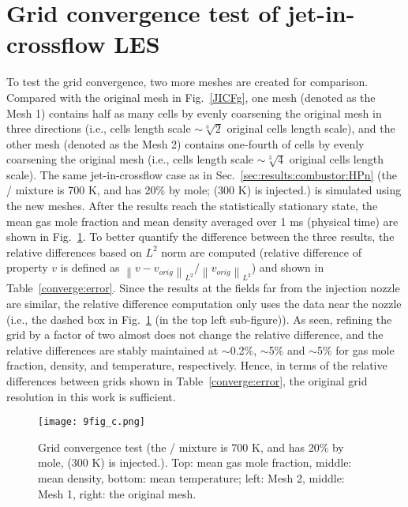 \section{Grid convergence test of jet-in-crossflow LES} \label{app:coverge}

    To test the grid convergence, two more meshes are created for comparison. Compared with the original mesh in Fig.~\ref{JICFg}, one mesh (denoted as the Mesh 1) contains half as many cells by evenly coarsening the original mesh in three directions (i.e., cells length scale $\sim \sqrt[3]{2}$ original cells length scale), and the other mesh (denoted as the Mesh 2) contains one-fourth of cells by evenly coarsening the original mesh (i.e., cells length scale $\sim \sqrt[3]{4}$ original cells length scale). The same jet-in-crossflow case as in Sec.~\ref{sec:results:combustor:HPn} (the / mixture is 700 K, and has 20\%  by mole;  (300 K) is injected.) is simulated using the new meshes. After the results reach the statistically stationary state, the mean gas mole fraction and mean density averaged over 1 ms (physical time) are shown in Fig.~\ref{converge}. %
    To better quantify the difference between the three results, the relative differences based on $L^2$ norm are computed (relative difference of property $v$ is defined as $\left\|v-v_{orig}\right\|_{L^2}/\left\|v_{orig}\right\|_{L^2}$) and shown in Table~\ref{converge:error}. Since the results at the fields far from the injection nozzle are similar, the relative difference computation only uses the data near the nozzle (i.e., the dashed box in Fig.~\ref{converge} (in the top left sub-figure)). As seen, refining the grid by a factor of two almost does not change the relative difference, and the relative differences are stably maintained at $\sim$0.2\%, $\sim$5\% and $\sim$5\% for gas mole fraction, density, and temperature, respectively. Hence, in terms of the relative differences between grids shown in Table~\ref{converge:error}, the original grid resolution in this work is sufficient.
    

    \begin{figure}[htbp]
        \centering
        \texttt{[image: 9fig\_c.png]}
        \caption{Grid convergence test (the / mixture is 700 K, and has 20\%  by mole,  (300 K) is injected.). Top: mean gas mole fraction, middle: mean density, bottom: mean temperature; left: Mesh 2, middle: Mesh 1, right: the original mesh.}
        \label{converge}
    \end{figure}

